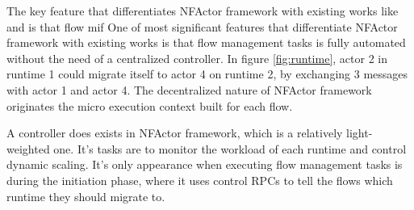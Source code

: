 The key feature that differentiates NFActor framework with existing works like \cite{gember2015opennf} and \cite{rajagopalan2013split} is that flow mif
One of most significant features that differentiate NFActor framework with existing works \cite{gember2015opennf} is that flow management tasks is fully automated without the need of a centralized controller. In figure \ref{fig:runtime}, actor 2 in runtime 1 could migrate itself to actor 4 on runtime 2, by exchanging 3 messages with actor 1 and actor 4. The decentralized nature of NFActor framework originates the micro execution context built for each flow.

A controller does exists in NFActor framework, which is a relatively light-weighted one. It's tasks are to monitor the workload of each runtime and control dynamic scaling. It's only appearance when executing flow management tasks is during the initiation phase, where it uses control RPCs to tell the flows which runtime they should migrate to.
